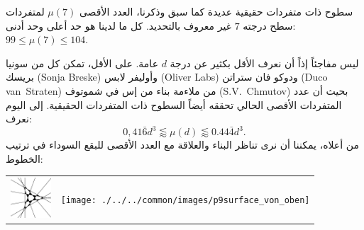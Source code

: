 \begin{surferPage}[216 Singularities]{سطوح ذات متفردات حقيقية عديدة} 
كما سبق وذكرنا، العدد الأقصى $\mu(7)$ لمتفردات سطح درجته $7$ غير معروف بالتحديد. كل ما لدينا هو حد أعلى وحد أدنى: $99\le \mu(7) \le 104$. 

   ليس مفاجئاً إذاً أن نعرف الأقل بكثير عن درجة  $d$ عامة.
    على الأقل، تمكن كل من سونيا بريسك (Sonja Breske) وأوليفر لابس (Oliver Labs) ودوكو فان ستراتن (Duco van~Straten) من ملاءمة بناء من إس في شموتوف (S.V.\ Chmutov) بحيث أن عدد المتفردات الأقصى الحالي تحققه أيضاً السطوح ذات المتفردات الحقيقية.
    إلى اليوم نعرف:
    \[0,41\bar{6}d^3 \lessapprox \mu(d) \lessapprox 0.44\bar{4} d^3.\]
    من أعلاه، يمكننا أن نرى تناظر البناء والعلاقة مع العدد الأقصى للبقع السوداء في ترتيب الخطوط:
    \begin{center}
      \begin{tabular}{c@{\qquad}c}
        \includegraphics[height=1.5cm]{./../../common/images/vielesing.pdf}
        &
        \texttt{[image: ./../../common/images/p9surface\_von\_oben]}
      \end{tabular}
    \end{center}
\end{surferPage}
